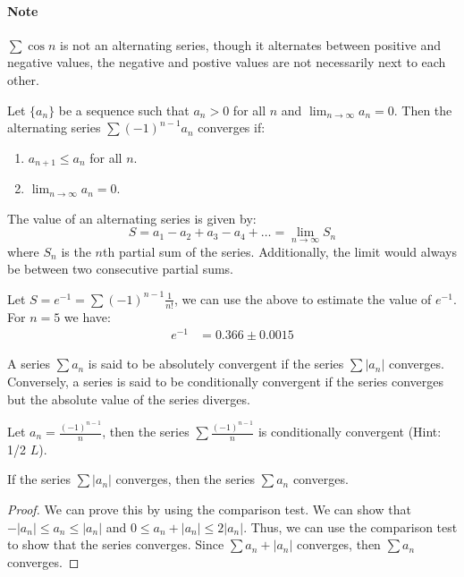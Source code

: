 \documentclass[11pt]{article}
\begin{document}
\paragraph{Note} $\sum \cos n$ is not an alternating series, though it alternates between positive and negative values, the negative and postive values are not necessarily next to each other.
\begin{theorem}
    Let $\{a_n\}$ be a sequence such that $a_n > 0$ for all $n$ and $\lim_{n \to \infty} a_n = 0$. Then the alternating series $\sum (-1)^{n-1} a_n$ converges if:
    \begin{enumerate}
        \item $a_{n+1} \le a_n$ for all $n$.
        \item $\lim_{n \to \infty} a_n = 0$.
    \end{enumerate}
\end{theorem}
\begin{theorem}
    The value of an alternating series is given by:
    \begin{equation}
        S = a_1 - a_2 + a_3 - a_4 + \ldots = \lim_{n \to \infty} S_n
    \end{equation}
    where $S_n$ is the $n$th partial sum of the series. Additionally, the limit would always be between two consecutive partial sums.
\end{theorem}
\begin{example}
    Let $S = e^{-1} = \sum (-1)^{n-1} \frac{1}{n!}$, we can use the above to estimate the value of $e^{-1}$. For $n=5$ we have:
    \begin{align*}
        e^{-1} &= 0.366 \pm 0.0015
    \end{align*}
\end{example}
\begin{definition}
    A series $\sum a_n$ is said to be absolutely convergent if the series $\sum |a_n|$ converges. Conversely, a series is said to be conditionally convergent if the series converges but the absolute value of the series diverges.
\end{definition}
\begin{example}
    Let $a_n = \frac{(-1)^{n-1}}{n}$, then the series $\sum \frac{(-1)^{n-1}}{n}$ is conditionally convergent (Hint: 1/2 $L$).
\end{example}
\begin{theorem}
    If the series $\sum |a_n|$ converges, then the series $\sum a_n$ converges.
\end{theorem}
\begin{proof}
    We can prove this by using the comparison test. We can show that $-|a_n| \le a_n \le |a_n|$ and $0 \le a_n + |a_n| \le 2|a_n|$. Thus, we can use the comparison test to show that the series converges. Since $\sum a_n + |a_n|$ converges, then $\sum a_n$ converges.
\end{proof}
\end{document}
